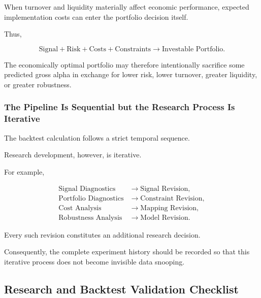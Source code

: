 \documentclass[11pt,a4paper]{article}
\begin{document}
When turnover and liquidity materially affect economic performance, expected
implementation costs can enter the portfolio decision itself.

Thus,

\begin{equation}
\boxed{
\text{Signal}
+
\text{Risk}
+
\text{Costs}
+
\text{Constraints}
\rightarrow
\text{Investable Portfolio}.
}
\end{equation}

The economically optimal portfolio may therefore intentionally sacrifice some
predicted gross alpha in exchange for lower risk, lower turnover, greater
liquidity, or greater robustness.


\subsubsection{The Pipeline Is Sequential but the Research Process Is Iterative}

The backtest calculation follows a strict temporal sequence.

Research development, however, is iterative.

For example,

\begin{equation}
\boxed{
\begin{aligned}
\text{Signal Diagnostics}
&\rightarrow
\text{Signal Revision},
\\
\text{Portfolio Diagnostics}
&\rightarrow
\text{Constraint Revision},
\\
\text{Cost Analysis}
&\rightarrow
\text{Mapping Revision},
\\
\text{Robustness Analysis}
&\rightarrow
\text{Model Revision}.
\end{aligned}
}
\end{equation}

Every such revision constitutes an additional research decision.

Consequently, the complete experiment history should be recorded so that this
iterative process does not become invisible data snooping.


\subsection{Research and Backtest Validation Checklist}
\label{subsec:research_backtest_validation_checklist}
\end{document}
